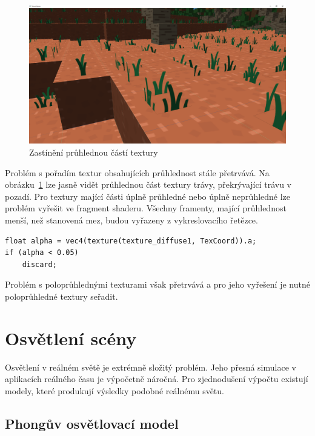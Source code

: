 \documentclass[thesis=M,czech]{FITthesis}[2019/12/23]
\begin{document}
\begin{figure}\centering
	\includegraphics[width=\textwidth]{images/alpha_cut_off}
	\caption[Zastínění průhlednou částí textury]{Zastínění průhlednou částí textury}\label{fig:alpha_cut_off}
\end{figure}

Problém s pořadím textur obsahujících průhlednost stále přetrvává. Na obrázku~\ref{fig:alpha_cut_off} lze jasně vidět průhlednou část textury trávy, překrývající trávu v pozadí. Pro textury mající části úplně průhledné nebo úplně neprůhledné lze problém vyřešit ve fragment shaderu. Všechny framenty, mající průhlednost menší, než stanovená mez, budou vyřazeny z vykreslovacího řetězce.

\begin{verbatim}
float alpha = vec4(texture(texture_diffuse1, TexCoord)).a;
if (alpha < 0.05)
    discard;
\end{verbatim}

Problém s poloprůhlednými texturami však přetrvává a pro jeho vyřešení je nutné poloprůhledné textury seřadit.



\chapter{Osvětlení scény}

Osvětlení v reálném světě je extrémně složitý problém. Jeho přesná simulace v aplikacích reálného času je výpočetně náročná. Pro zjednodušení výpočtu existují modely, které produkují výsledky podobné reálnému světu.

\section{Phongův osvětlovací model}
\end{document}
